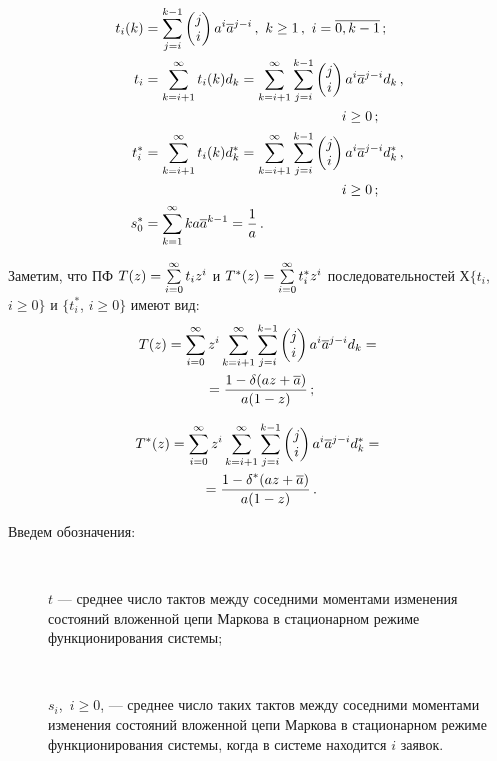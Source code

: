 \begin{multicols}{2}
\noindent
\begin{align*}
t_i(k) &= \sum_{j=i}^{k-1} \begin{pmatrix}j \\ i\end{pmatrix} a^i \a^{j-i}\,,
 \ k\ge 1\,,
 \ i=\overline{0,k-1}\,;
\\
t_i &= \sum_{k=i+1}^\infty t_i(k) d_k = \sum_{k=i+1}^\infty \sum_{j=i}^{k-1}
\begin{pmatrix}j \\ i\end{pmatrix} a^i \a^{j-i} d_k\,,\\
&\hspace*{50mm} i\ge 0\,;
\\
t^*_i &= \sum_{k=i+1}^\infty t_i(k) d^*_k = \sum\limits_{k=i+1}^\infty
\sum_{j=i}^{k-1} \begin{pmatrix}j \\ i\end{pmatrix} a^i \a^{j-i} d^*_k\,,\\
&\hspace*{50mm}  i\ge 0\,;
\\
s^*_0 &= \sum_{k=1}^\infty k a \a^{k-1} = \fr{1}{a}\,.
\end{align*}

Заметим, что ПФ $T(z)\hm=\sum\limits_{i=0}^{\infty} t_{i}z^{i}$ и
$T^*(z)\hm=\sum\limits_{i=0}^{\infty} t_{i}^*z^{i}$
последовательностей $Х\{t_i$, $i\ge 0\}$ и
$\{t^*_i$, $i\ge 0\}$ имеют вид:
\begin{multline*}
T(z) =
\sum_{i=0}^\infty z^i \sum_{k=i+1}^\infty \sum_{j=i}^{k-1} \begin{pmatrix}j \\ i\end{pmatrix} a^i \overline a^{j-i} d_k
={}\\
{}= \displaystyle\frac{\displaystyle 1-\delta(az + \overline a)\mathstrut}{\displaystyle a(1 - z)\mathstrut}\,;
\end{multline*}

\noindent
\begin{multline*}
T^*(z) = \sum_{i=0}^\infty z^i \sum_{k=i+1}^\infty \sum_{j=i}^{k-1}
\begin{pmatrix}j \\ i\end{pmatrix} a^i \overline a^{j-i} d^*_k
={}\\
{}=\displaystyle\frac{\displaystyle 1 - \delta^*(az + \overline a)\mathstrut}{\displaystyle a(1 - z)\mathstrut}\,.
\end{multline*}

\vspace*{-6pt}

Введем обозначения:
\begin{description}
\item[\,]  $t$ --- среднее число тактов между соседними моментами
изменения состояний вложенной цепи Маркова в стационарном
режиме функционирования системы;
\item[\,]
$s_i$,\ $i \ge 0$, --- среднее число таких тактов между
соседними моментами изменения состояний вложенной цепи
Маркова в стационарном режиме функционирования системы,
когда в системе находится $i$ заявок.
\end{description}


\end{multicols}

